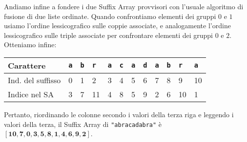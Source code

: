 Andiamo infine a fondere i due Suffix Array provvisori con l'usuale algoritmo di
fusione di due liste ordinate. Quando confrontiamo elementi dei gruppi \(0\) e 
\(1\) usiamo l'ordine lessicografico sulle coppie associate, e analogamente 
l'ordine lessicografico sulle triple associate per confrontare elementi dei gruppi
\(0\) e \(2\). Otteniamo infine:
\begin{table}[H]
  \begin{tabularx}{\linewidth}{l*{11}{X}}
    Carattere              & \texttt{a} & \texttt{b} & \texttt{r} & \texttt{a}
                           & \texttt{c} & \texttt{a} & \texttt{d} & \texttt{a}
                           & \texttt{b} & \texttt{r} & \texttt{a} \\
    \hline
    Ind. del suffisso      & 0 & 1 & 2 & 3
                           & 4 & 5 & 6 & 7
                           & 8 & 9 & 10 \\
    Indice nel SA          & 3 & 7 & 11 & 4
                           & 8 & 5 & 9 & 2
                           & 6 & 10 & 1 \\
  \end{tabularx}
\end{table}
Pertanto, riordinando le colonne secondo i valori della terza riga e leggendo i
valori della terza, il Suffix Array di \texttt{\string"abracadabra\string"} \`e 
\([\mathbf{10},\mathbf{7},\mathbf{0},\mathbf{3},\mathbf{5},\mathbf{8},\mathbf{1},
\mathbf{4},\mathbf{6},\mathbf{9},\mathbf{2}]\).